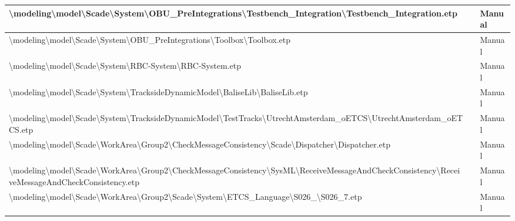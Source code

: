 \begin{longtable}{|>{\RaggedRight}p{}|>{\RaggedRight}p{}|>{\RaggedRight}p{}|}
\hline
\textbackslash \allowbreak modeling\textbackslash \allowbreak model\textbackslash \allowbreak Scade\textbackslash \allowbreak System\textbackslash \allowbreak OBU\_\allowbreak PreIntegrations\textbackslash \allowbreak Testbench\_\allowbreak Integration\textbackslash \allowbreak Testbench\_\allowbreak Integration.etp& &Manual\\
\hline
\textbackslash \allowbreak modeling\textbackslash \allowbreak model\textbackslash \allowbreak Scade\textbackslash \allowbreak System\textbackslash \allowbreak OBU\_\allowbreak PreIntegrations\textbackslash \allowbreak Toolbox\textbackslash \allowbreak Toolbox.etp& &Manual\\
\hline
\textbackslash \allowbreak modeling\textbackslash \allowbreak model\textbackslash \allowbreak Scade\textbackslash \allowbreak System\textbackslash \allowbreak RBC-System\textbackslash \allowbreak RBC-System.etp& &Manual\\
\hline
\textbackslash \allowbreak modeling\textbackslash \allowbreak model\textbackslash \allowbreak Scade\textbackslash \allowbreak System\textbackslash \allowbreak TracksideDynamicModel\textbackslash \allowbreak BaliseLib\textbackslash \allowbreak BaliseLib.etp& &Manual\\
\hline
\textbackslash \allowbreak modeling\textbackslash \allowbreak model\textbackslash \allowbreak Scade\textbackslash \allowbreak System\textbackslash \allowbreak TracksideDynamicModel\textbackslash \allowbreak TestTracks\textbackslash \allowbreak UtrechtAmsterdam\_\allowbreak oETCS\textbackslash \allowbreak UtrechtAmsterdam\_\allowbreak oETCS.etp& &Manual\\
\hline
\textbackslash \allowbreak modeling\textbackslash \allowbreak model\textbackslash \allowbreak Scade\textbackslash \allowbreak WorkArea\textbackslash \allowbreak Group2\textbackslash \allowbreak CheckMessageConsistency\textbackslash \allowbreak Scade\textbackslash \allowbreak Dispatcher\textbackslash \allowbreak Dispatcher.etp& &Manual\\
\hline
\textbackslash \allowbreak modeling\textbackslash \allowbreak model\textbackslash \allowbreak Scade\textbackslash \allowbreak WorkArea\textbackslash \allowbreak Group2\textbackslash \allowbreak CheckMessageConsistency\textbackslash \allowbreak SysML\textbackslash \allowbreak ReceiveMessageAndCheckConsistency\textbackslash \allowbreak ReceiveMessageAndCheckConsistency.etp& &Manual\\
\hline
\textbackslash \allowbreak modeling\textbackslash \allowbreak model\textbackslash \allowbreak Scade\textbackslash \allowbreak WorkArea\textbackslash \allowbreak Group2\textbackslash \allowbreak Scade\textbackslash \allowbreak System\textbackslash \allowbreak ETCS\_\allowbreak Language\textbackslash \allowbreak S026\_\allowbreak 7\textbackslash \allowbreak S026\_\allowbreak 7.etp& &Manual\\

\end{longtable}
